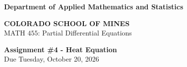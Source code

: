 \documentclass[12pt]{article}
\begin{document}
\begin{flushleft}

\textbf{Department of Applied Mathematics and Statistics}

\textbf{COLORADO SCHOOL OF MINES}\\


MATH $455$: Partial Differential Equations
\end{flushleft}

\vspace{0.1in}

\begin{center}
{\bf Assignment \#4 - Heat Equation} \\
Due Tuesday, October 20, 2026 \\
\end{center}

\vspace{0.2in}
\end{document}
